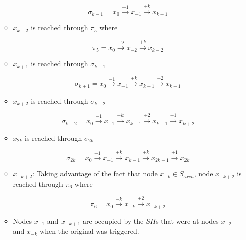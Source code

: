\begin{itemize}
\begin{itemize}
$$ \sigma_{k-1} =  x_{0}\xrightarrow {-1}x_{-1}\xrightarrow {+k}x_{k-1}$$



\item $x_{k-2}$ is reached through $\pi_5$ where 
 
$$\pi_5 =  x_{0}\xrightarrow {-2}x_{-2}\xrightarrow {+k}x_{k-2}$$



\item $x_{k+1}$ is reached through  $\sigma_{k+1}$ 
 
$$ \sigma_{k+1} =  x_{0}\xrightarrow {-1}x_{-1}\xrightarrow {+k}x_{k-1}\xrightarrow {+2}x_{k+1}$$

\item  $x_{k+2}$ is reached through  $\sigma_{k+2}$ 
 
$$ \sigma_{k+2} =  x_{0}\xrightarrow {-1}x_{-1}\xrightarrow {+k}x_{k-1}\xrightarrow {+2}x_{k+1}\xrightarrow {+1}x_{k+2}$$



\item $x_{2k}$ is reached through $\sigma_{2k}$
 
$$\sigma_{2k} = x_{0} \xrightarrow {-1} x_{-1} \xrightarrow {+k} x_{k-1} \xrightarrow {+k} x_{2k-1} \xrightarrow {+1}  x_{2k}$$

\item  $x_{-k+2}$:  Taking advantage of the fact that node $x_{-k}\in S_{area}$, node  $x_{-k+2}$ is reached through $\pi_6$ where 
 
$$\pi_6 =  x_{0}\xrightarrow {-k}x_{-k} \xrightarrow {+2}x_{-k+2}$$


 

 
\item Nodes $x_{-1}$  and $x_{-k+1}$ are occupied by the $SH$s that were at nodes  $x_{-2}$ and $x_{-k}$ when the original \bv was triggered.
\end{itemize}




\end{itemize}
